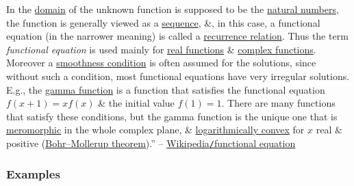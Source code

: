\documentclass{article}
\begin{document}
In the \href{https://en.wikipedia.org/wiki/Domain_of_a_function}{domain} of the unknown function is supposed to be the \href{https://en.wikipedia.org/wiki/Natural_number}{natural numbers}, the function is generally viewed as a \href{https://en.wikipedia.org/wiki/Sequence_(mathematics)}{sequence}, \&, in this case, a functional equation (in the narrower meaning) is called a \href{https://en.wikipedia.org/wiki/Recurrence_relation}{recurrence relation}. Thus the term \textit{functional equation} is used mainly for \href{https://en.wikipedia.org/wiki/Real_function}{real functions} \& \href{https://en.wikipedia.org/wiki/Complex_function}{complex functions}. Moreover a \href{https://en.wikipedia.org/wiki/Smooth_function}{smoothness condition} is often assumed for the solutions, since without such a condition, most functional equations have very irregular solutions. E.g., the \href{https://en.wikipedia.org/wiki/Gamma_function}{gamma function} is a function that satisfies the functional equation $f(x + 1) = xf(x)$ \& the initial value $f(1) = 1$. There are many functions that satisfy these conditions, but the gamma function is the unique one that is \href{https://en.wikipedia.org/wiki/Meromorphic_function}{meromorphic} in the whole complex plane, \& \href{https://en.wikipedia.org/wiki/Logarithmically_convex_function}{logarithmically convex} for $x$ real \& positive (\href{https://en.wikipedia.org/wiki/Bohr%E2%80%93Mollerup_theorem}{Bohr--Mollerup theorem}).'' -- \href{https://en.wikipedia.org/wiki/Functional_equation}{Wikipedia\texttt{/}functional equation}

\subsubsection{Examples}
\end{document}
